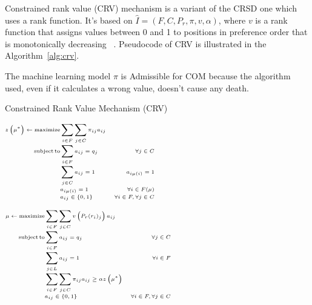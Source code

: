 Constrained rank value (CRV) mechanism is a variant of the CRSD one which uses a rank function.
It's based on \(\hat {I} = (F, C, P_r, \pi, v, \alpha)\), where \(v\) is a rank function that assigns values between 0 and 1 to positions in preference order that is monotonically decreasing ~\cite{olbergml}.
Pseudocode of CRV is illustrated in the Algorithm~\ref{alg:crv}.

The machine learning model \(\pi\) is Admissible for COM because the algorithm used, even if it calculates a wrong value, doesn’t cause any death.

\begin{algorithm}
    \caption{Constrained Rank Value Mechanism (CRV)}\label{alg:crv}
    \KwResult{\(\mu\)}
    \(\tiny
        \begin{aligned}
            z \left( \mu^* \right) \leftarrow \operatorname{maximize} & \sum_{i \in F} \sum_{j \in C} \pi_{i j} a_{i j} \\[-1mm]
            \operatorname {subject}\operatorname{to} & \sum_{i \in F} a_{i j}=q_{j} & \forall j \in C \\[-1mm]
            & \sum_{j \in C} a_{i j}=1 & a_{i \mu(i)}=1 \\[-1mm]
            & a_{i\mu (i)} = 1 &  \forall i \in F(\mu) \\[-1mm]
            & a_{i j} \in\{0,1\} & \forall i \in F, \forall j \in C
        \end{aligned}
    \)%

    \(\tiny
        \begin{aligned}
            \mu \leftarrow \operatorname{maximize} & \sum_{i \in F} \sum_{j \in C} v\left(P_r(r_i)_j\right) a_{i j} \\[-1mm]
            \operatorname {subject}\operatorname{to} & \sum_{i \in F} a_{i j}=q_{j} & \forall j \in C \\[-1mm]
            & \sum_{j \in L} a_{i j}=1 & \forall i \in F \\[-1mm]
            & \sum_{i \in F} \sum_{j \in C} \pi_{i j} a_{i j} \geq \alpha z \left( \mu^* \right) \\[-1mm]
            & a_{i j} \in\{0,1\} & \forall i \in F, \forall j \in C
        \end{aligned}
    \)%
\end{algorithm}
